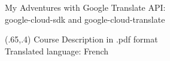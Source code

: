 \documentclass{beamer}
\begin{document}
\begin{frame}{My Adventures with Google Translate API:\\
google-cloud-sdk and google-cloud-translate}


\begin{textblock}{1}(.65,.4)
  \footnotesize  {Course Description in .pdf format \\
Translated language: French}
\end{textblock}

\end{frame}
\end{document}
